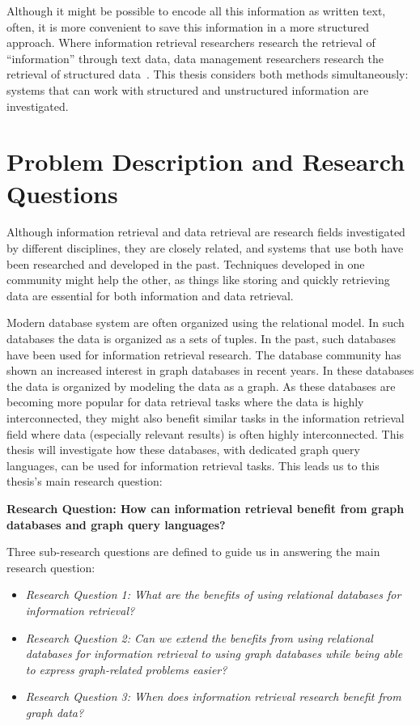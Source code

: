Although it might be possible to encode all this information as written text, often, it is more convenient to save this information in a more structured approach. Where information retrieval researchers research the retrieval of ``information'' through text data, data management researchers research the retrieval of structured data~\citep{rijsbergen79information}. This thesis considers both methods simultaneously: systems that can work with structured and unstructured information are investigated.

\section{Problem Description and Research Questions}
Although information retrieval and data retrieval are research fields investigated by different disciplines, they are closely related, and systems that use both have been researched and developed in the past. Techniques developed in one community might help the other, as things like storing and quickly retrieving data are essential for both information and data retrieval. 

Modern database system are often organized using the relational model. In such databases the data is organized as a sets of tuples. In the past, such databases have been used for information retrieval research. The database community has shown an increased interest in graph databases in recent years. In these databases the data is organized by modeling the data as a graph. As these databases are becoming more popular for data retrieval tasks where the data is highly interconnected, they might also benefit similar tasks in the information retrieval field where data (especially relevant results) is often highly interconnected. This thesis will investigate how these databases, with dedicated graph query languages, can be used for information retrieval tasks. This leads us to this thesis's main research question:

 \textbf{Research Question: How can information retrieval benefit from graph databases and graph query languages?}

Three sub-research questions are defined to guide us in answering the main research question:

\begin{itemize}
	\item \emph{Research Question 1: What are the benefits of using relational databases for information retrieval?} 
	\item \emph{Research Question 2: Can we extend the benefits from using relational databases for information retrieval to using graph databases while being able to express graph-related problems easier?}  
	\item \emph{Research Question 3: When does information retrieval research benefit from graph data?} 
\end{itemize}


